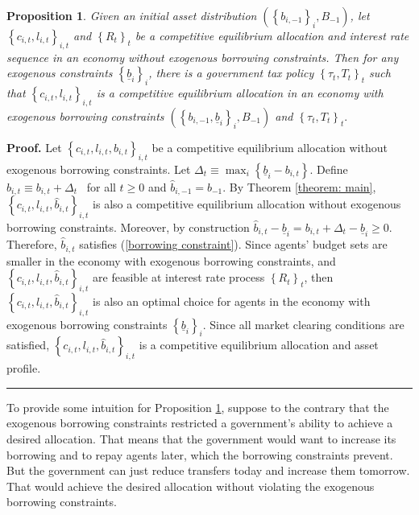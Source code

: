 \documentclass[thmsb,11pt]{article}
\newtheorem{proposition}{Proposition}
\newenvironment{proof}[1][Proof]{\noindent \textbf{#1.} }{\  \rule{0.5em}{0.5em}}
\begin{document}
\begin{proposition}
\label{thm:borrowing_constraint}  Given an initial asset distribution $\left(
\left\{ b_{i,-1}\right\} _{i},B_{-1}\right)$, let $\left\{ c_{i,t},l_{i,t}\right\} _{i,t}$ and $\left\{ R_{t}\right\}_t $ be a competitive
equilibrium allocation and interest rate sequence in an economy without
exogenous borrowing constraints. Then for any exogenous
constraints $\left\{ \underline{b}_{i}\right\} _{i}$, there is a government
tax policy $\left\{ \tau _{t},T_{t}\right\} _{t}$ such that $\left\{
c_{i,t},l_{i,t}\right\} _{i,t}$ is a competitive equilibrium
allocation in an economy with exogenous borrowing constraints $\left(
\left\{ b_{i,-1},\underline{b}_{i}\right\} _{i},B_{-1}\right) $ and $\left\{
\tau _{t},T_{t}\right\} _{t}.$
\end{proposition}

\begin{proof}
Let $\left\{ c_{i,t},l_{i,t},b_{i,t}\right\} _{i,t}$
be a competitive equilibrium allocation without exogenous borrowing
constraints. Let $\Delta _{t}\equiv \max_{i}\left\{ \underline{b}%
_{i}-b_{i,t}\right\} .$ Define $\hat{b}_{i,t}\equiv b_{i,t}+\Delta _{t}$ \ for all $t\geq 0$ and $\hat{b}_{i,-1}=b_{-1}.$ By Theorem %
\ref{theorem: main}, $\left\{ c_{i,t},l_{i,t},\hat{b}%
_{i,t}\right\} _{i,t}$ is also a competitive equilibrium allocation without
exogenous borrowing constraints. Moreover, by construction $\hat{b}_{i,t}-%
\underline{b}_{i}=b_{i,t}+\Delta _{t}-\underline{b}_{i}\geq 0$.
Therefore, $\hat{b}_{i,t}$ satisfies (\ref{borrowing constraint}). Since
agents' budget sets are smaller in the economy with exogenous borrowing
constraints, and $\left\{ c_{i,t},l_{i,t},\hat{b}%
_{i,t}\right\} _{i,t}$ are feasible at interest rate process $\left\{
R_{t}\right\} _{t}$, then $\left\{ c_{i,t},l_{i,t},%
\hat{b}_{i,t}\right\} _{i,t}$ is also an optimal choice for agents in the
economy with exogenous borrowing constraints $\left\{ \underline{b}%
_{i}\right\} _{i}.$ Since all market clearing conditions are satisfied, $%
\left\{ c_{i,t},l_{i,t},\hat{b}_{i,t}\right\} _{i,t}$ is a
competitive equilibrium allocation and asset profile.
\end{proof}

To provide some intuition for Proposition \ref{thm:borrowing_constraint}, suppose to the contrary that the exogenous borrowing constraints  restricted a  government's
 ability to achieve a desired allocation. That  means that
the government would want to increase  its borrowing
and to repay agents later, which the borrowing constraints prevent. But the government can just reduce
transfers today and increase them tomorrow. That would  achieve the  desired  allocation
without violating the exogenous borrowing constraints.
\end{document}

